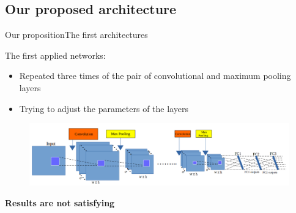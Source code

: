 \documentclass[10pt,svgnames]{beamer}
\begin{document}
\subsection{Our proposed architecture}
\begin{frame}{Our proposition}{The first architectures}
	\begin{block}{The first applied networks:}
	\begin{itemize}
		\item Repeated three times of the pair of {\color{conv}convolutional} and {\color{pool}maximum pooling} layers
		\item Trying to adjust the parameters of the layers
	\end{itemize}	
   	\end{block}
   	\begin{center}
   		\begin{figure}[htbp]
   			\centering
    		\includegraphics[scale=.28]{images/arch_cnn2}    
		\end{figure}
		\textbf{\color{red}Results are not satisfying}
   \end{center}
\end{frame}
\end{document}
